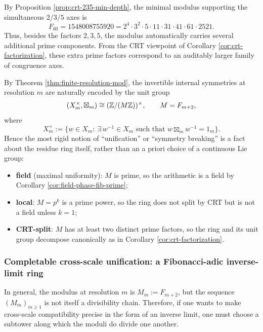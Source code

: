 \begin{remark}[\texorpdfstring{$m=58$}{m=58}: the three-axis CRT modulus and its rich prime-factor structure]\label{rem:crt-235-m58-factorization}
By Proposition \ref{prop:crt-235-min-depth}, the minimal modulus supporting the simultaneous \(2/3/5\) axes is
\[
F_{60}=1548008755920
=2^4\cdot 3^2\cdot 5\cdot 11\cdot 31\cdot 41\cdot 61\cdot 2521.
\]
Thus, besides the factors \(2,3,5\), the modulus automatically carries several additional prime components. From the CRT viewpoint of Corollary \ref{cor:crt-factorization}, these extra prime factors correspond to an auditably larger family of congruence axes.
\end{remark}

\begin{remark}\label{rem:ring-phase-trichotomy}
By Theorem \ref{thm:finite-resolution-mod}, the invertible internal symmetries at resolution \(m\) are naturally encoded by the unit group
\[
(X_m^\times,\boxtimes_m)\cong (\mathbb{Z}/(M\mathbb{Z}))^\times,
\qquad
M=F_{m+2},
\]
where
\[
X_m^\times:=\{w\in X_m:\ \exists\,w^{-1}\in X_m\text{ such that }w\boxtimes_m w^{-1}=1_m\}.
\]
Hence the most rigid notion of ``unification'' or ``symmetry breaking'' is a fact about the residue ring itself, rather than an a priori choice of a continuous Lie group:
\begin{itemize}
  \item \textbf{field} (maximal uniformity): \(M\) is prime, so the arithmetic is a field by Corollary \ref{cor:field-phase-fib-prime};
  \item \textbf{local}: \(M=p^k\) is a prime power, so the ring does not split by CRT but is not a field unless \(k=1\);
  \item \textbf{CRT-split}: \(M\) has at least two distinct prime factors, so the ring and its unit group decompose canonically as in Corollary \ref{cor:crt-factorization}.
\end{itemize}
\end{remark}

\subsubsection{Completable cross-scale unification: a Fibonacci-adic inverse-limit ring}\label{subsubsec:fib-adic-inverse-limit}
In general, the modulus at resolution \(m\) is \(M_m:=F_{m+2}\), but the sequence \((M_m)_{m\ge 1}\) is not itself a divisibility chain. Therefore, if one wants to make cross-scale compatibility precise in the form of an inverse limit, one must choose a subtower along which the moduli do divide one another.

